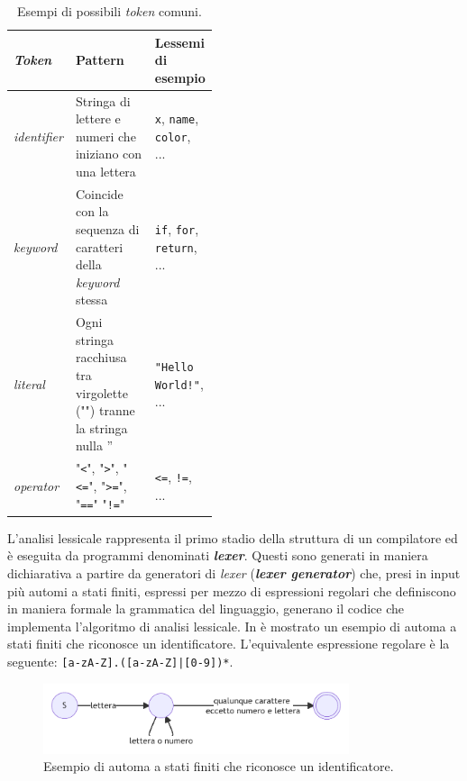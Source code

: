 \begin{table}[h]
    \centering
    \begin{tabular}{|p{0.15\linewidth}|p{0,45\linewidth}|p{0.3\linewidth}|}
        \hline
        \textbf{\textit{Token}} & \textbf{Pattern} & \textbf{Lessemi di esempio} \\ [0.5ex] 
        \hline\hline
        \textit{identifier} & Stringa di lettere e numeri che iniziano con una lettera & \texttt{x}, \texttt{name}, \texttt{color}, ... \\ 
        \hline
        \textit{keyword} & Coincide con la sequenza di caratteri della \textit{keyword} stessa & \texttt{if}, \texttt{for}, \texttt{return}, ... \\
        \hline
        \textit{literal} & Ogni stringa racchiusa tra virgolette ("") tranne la stringa nulla '' & \texttt{"Hello World!"}, ... \\
        \hline
        \textit{operator} & "\texttt{<}", "\texttt{>}", "\texttt{<=}", "\texttt{>=}", "\texttt{==}" "\texttt{!=}" & \texttt{<=}, \texttt{!=}, ... \\
        \hline
    \end{tabular}
    \caption{Esempi di possibili \textit{token} comuni.}
    \label{table:token-examples}
\end{table}

L'analisi lessicale rappresenta il primo stadio della struttura di un compilatore ed è eseguita da programmi denominati \textbf{\textit{lexer}}. 
%
Questi sono generati in maniera dichiarativa a partire da generatori di \textit{lexer} (\textbf{\textit{lexer generator}}) che, presi in input più automi a stati finiti, espressi per mezzo di espressioni regolari che definiscono in maniera formale la grammatica del linguaggio, generano il codice che implementa l'algoritmo di analisi lessicale. 
%
In  è mostrato un esempio di automa a stati finiti che riconosce un identificatore.
%
L'equivalente espressione regolare è la seguente: \texttt{[a-zA-Z].([a-zA-Z]|[0-9])*}.

\begin{figure}[h]
    \centering
    \includegraphics[width=0.8\textwidth]{resources/img/01-id-finite-automa.pdf}
    \caption{Esempio di automa a stati finiti che riconosce un identificatore.}
    \label{img:01-id-finite-automa}
\end{figure}

